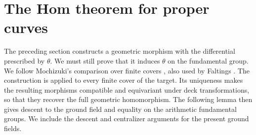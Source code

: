 \documentclass[11pt,a4paper]{article}
\numberwithin{equation}{section}
\theoremstyle{plain}
\theoremstyle{definition}
\theoremstyle{remark}
\renewcommand{\S}{\ensuremath{\mathsection}}
\begin{document}
\section{The Hom theorem for proper curves}
\label{sec:proper-hom}

The preceding section constructs a geometric morphism with the
differential prescribed by $\theta$. We must still prove that it induces
$\theta$ on the fundamental group. We follow Mochizuki's comparison
over finite covers \cite[\S14, proof of Theorem~14.1]{Mochizuki1999},
also used by Faltings \cite[proof of Theorem~14]{Faltings1998}.
The construction is applied to every finite cover of the target.
Its uniqueness makes the resulting
morphisms compatible and equivariant under deck transformations, so
that they recover the full geometric homomorphism. The following lemma
then gives descent to the ground field and equality on the arithmetic
fundamental groups. We include the descent and centralizer arguments
for the present ground fields.
\end{document}
